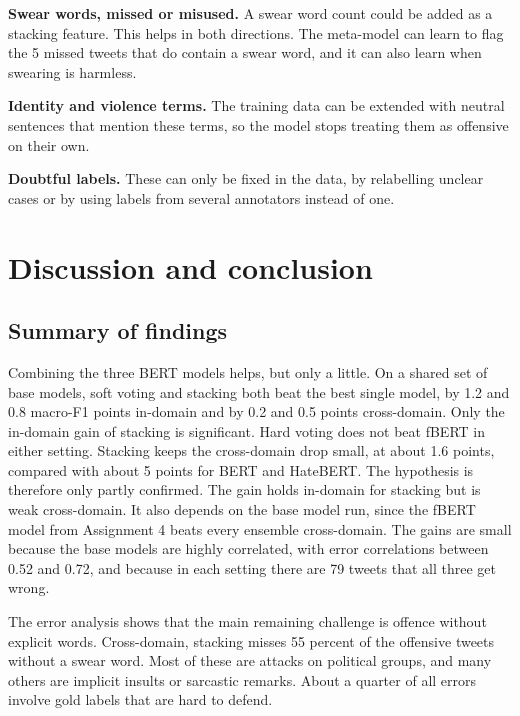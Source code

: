 \documentclass[11pt,a4paper]{article}
\begin{document}
\textbf{Swear words, missed or misused.} A swear word count could be added as a stacking feature. This helps in both directions. The meta-model can learn to flag the 5 missed tweets that do contain a swear word, and it can also learn when swearing is harmless.

\textbf{Identity and violence terms.} The training data can be extended with neutral sentences that mention these terms, so the model stops treating them as offensive on their own.

\textbf{Doubtful labels.} These can only be fixed in the data, by relabelling unclear cases or by using labels from several annotators instead of one.

\section{Discussion and conclusion}
\label{sec:conclusion}

\subsection{Summary of findings}

Combining the three BERT models helps, but only a little. On a shared set of base models, soft voting and stacking both beat the best single model, by 1.2 and 0.8 macro-F1 points in-domain and by 0.2 and 0.5 points cross-domain. Only the in-domain gain of stacking is significant. Hard voting does not beat fBERT in either setting. Stacking keeps the cross-domain drop small, at about 1.6 points, compared with about 5 points for BERT and HateBERT. The hypothesis is therefore only partly confirmed. The gain holds in-domain for stacking but is weak cross-domain. It also depends on the base model run, since the fBERT model from Assignment 4 beats every ensemble cross-domain. The gains are small because the base models are highly correlated, with error correlations between 0.52 and 0.72, and because in each setting there are 79 tweets that all three get wrong.

The error analysis shows that the main remaining challenge is offence without explicit words. Cross-domain, stacking misses 55 percent of the offensive tweets without a swear word. Most of these are attacks on political groups, and many others are implicit insults or sarcastic remarks. About a quarter of all errors involve gold labels that are hard to defend.
\end{document}
